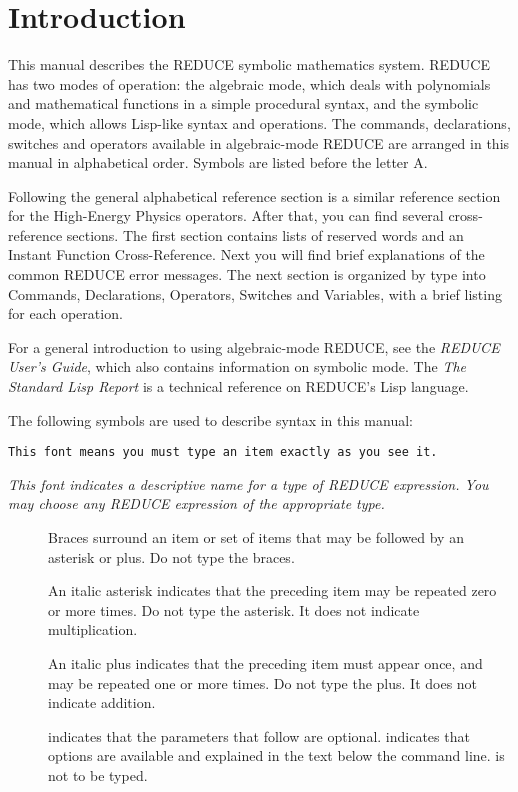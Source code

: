 \newpage
\section{Introduction}

This manual describes the REDUCE symbolic mathematics system.  REDUCE has
two modes of operation: the algebraic mode, which deals with polynomials
and mathematical functions in a simple procedural syntax, and the symbolic
mode, which allows Lisp-like syntax and operations.  The commands,
declarations, switches and operators available in algebraic-mode REDUCE
are arranged in this manual in alphabetical order.  Symbols are listed
before the letter A.

Following the general alphabetical reference section is a similar
reference section for the High-Energy Physics operators.  After that, you
can find several cross-reference sections.  The first section contains
lists of reserved words and an Instant Function Cross-Reference.  Next you
will find brief explanations of the common REDUCE error messages.  The
next section is organized by type into Commands, Declarations, Operators,
Switches and Variables, with a brief listing for each operation.

For a general introduction to using algebraic-mode REDUCE, see the {\em
REDUCE User's Guide}, which also contains information on symbolic mode.
The {\em The Standard Lisp Report} is a technical reference on REDUCE's
Lisp language.

The following symbols are used to describe syntax in this manual:

\begin{verbatim}
This font means you must type an item exactly as you see it.
\end{verbatim}

{\em This font indicates a descriptive name for a type of REDUCE expression.
You may choose any REDUCE expression of the appropriate type.}

\begin{description}
\item[\meta{\{\}}]
Braces surround an item or set of items that may be followed by an
asterisk or plus.  Do not type the braces.

\item[\meta{*}]
An italic asterisk indicates that the preceding item may be repeated zero or 
more times. Do not type the asterisk.  It does not indicate multiplication.

\item[\meta{+}]
An italic plus indicates that the preceding item must appear once, and may be 
repeated one or more times.  Do not type the plus.  It does not indicate
addition.

\item[]
 indicates that the parameters that follow are optional.
 indicates that options are available and explained in the
text below the command line.   is not to be typed.
\end{description}

